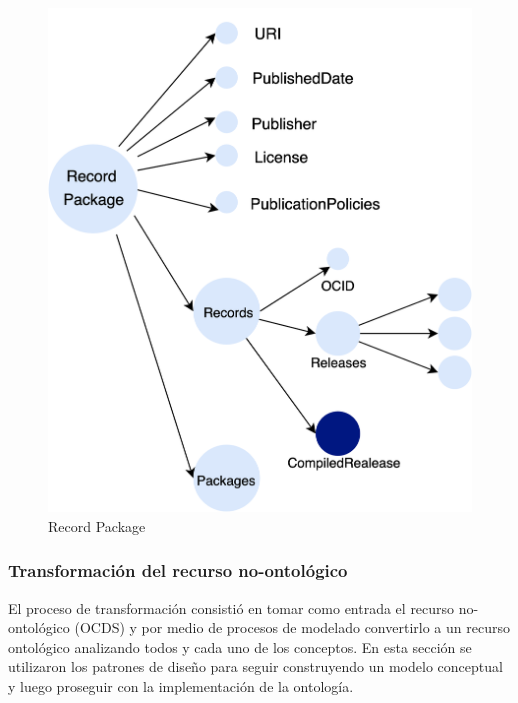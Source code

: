 \begin{figure}[ht!]
    \centering
    \includegraphics[width=150mm]{figuras/Diagramas-RecordPackage.png}
    \caption{Record Package}
    \label{img:Record Package}
\end{figure}


\subsubsection{Transformación del recurso no-ontológico}
El proceso de transformación consistió en tomar como entrada el recurso no-ontológico (OCDS) y por medio de procesos de modelado convertirlo a un recurso ontológico analizando todos y cada uno de los conceptos. 
En esta sección se utilizaron los patrones de diseño para seguir construyendo un modelo conceptual y luego proseguir con la implementación de la ontología. 
